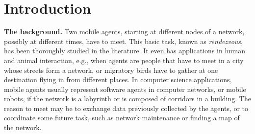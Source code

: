 \documentclass [11pt] {article}
\begin{document}
\pagebreak
\section{Introduction} \label{sec:intro}


\noindent
{\bf The background.}
Two mobile agents, starting at different nodes of a network, possibly at different times, have to meet.
This basic task,  known  as {\em rendezvous}, has been thoroughly studied in the literature.
It even has applications in human and animal interaction, e.g., when agents are people that have to meet in a city whose streets form a network,
or migratory birds have to gather at one destination flying in from different places.
In computer science applications,
mobile agents usually represent software agents in computer networks, or mobile robots, if the network is a labyrinth or is composed of corridors in a building.
The reason to meet may be to exchange data previously collected by the agents,
or to coordinate some future task, such as network maintenance or finding a map of the network.
\end{document}
